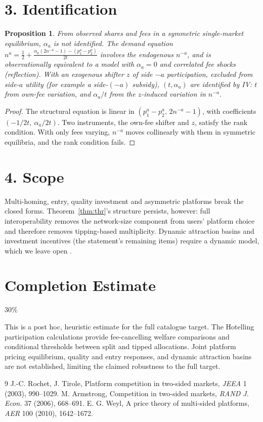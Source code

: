 \documentclass[11pt]{article}
\newtheorem{proposition}[theorem]{Proposition}
\theoremstyle{definition}
\begin{document}
\section*{3. Identification}
\begin{proposition}\label{prop:id}
From observed shares and fees in a symmetric single-market equilibrium, $\alpha_a$ is not identified. The demand equation
$n^a=\tfrac12+\tfrac{\alpha_a(2n^{-a}-1)-(p_1^a-p_2^a)}{2t}$ involves the endogenous $n^{-a}$, and is observationally
equivalent to a model with $\alpha_a=0$ and correlated fee shocks (reflection). With an exogenous shifter $z$ of side
$-a$ participation, excluded from side-$a$ utility (for example a side-$(-a)$ subsidy), $(t,\alpha_a)$ are identified by IV:
$t$ from own-fee variation, and $\alpha_a/t$ from the $z$-induced variation in $n^{-a}$.
\end{proposition}
\begin{proof}
The structural equation is linear in $(p_1^a-p_2^a,\,2n^{-a}-1)$, with coefficients $(-1/2t,\ \alpha_a/2t)$. Two
instruments, the own-fee shifter and $z$, satisfy the rank condition. With only fees varying, $n^{-a}$ moves collinearly
with them in symmetric equilibria, and the rank condition fails.
\end{proof}

\section*{4. Scope}
Multi-homing, entry, quality investment and asymmetric platforms break the closed forms. Theorem~\ref{thm:thr}'s
structure persists, however: full interoperability removes the network-size component from users' platform choice and
therefore removes tipping-based multiplicity. Dynamic attraction basins and investment incentives (the statement's
remaining items) require a dynamic model, which we leave open \cite{rt,arm,weyl}.

\section{Completion Estimate}
30\%

This is a post hoc, heuristic estimate for the full catalogue target.
The Hotelling participation calculations provide fee-cancelling welfare comparisons and conditional thresholds between split and tipped allocations. Joint platform pricing equilibrium, quality and entry responses, and dynamic attraction basins are not established, limiting the claimed robustness to the full target.

\begin{thebibliography}{9}
 J.-C. Rochet, J. Tirole, Platform competition in two-sided markets, \emph{JEEA} 1 (2003), 990--1029.
 M. Armstrong, Competition in two-sided markets, \emph{RAND J. Econ.} 37 (2006), 668--691.
 E. G. Weyl, A price theory of multi-sided platforms, \emph{AER} 100 (2010), 1642--1672.
\end{thebibliography}
\end{document}
